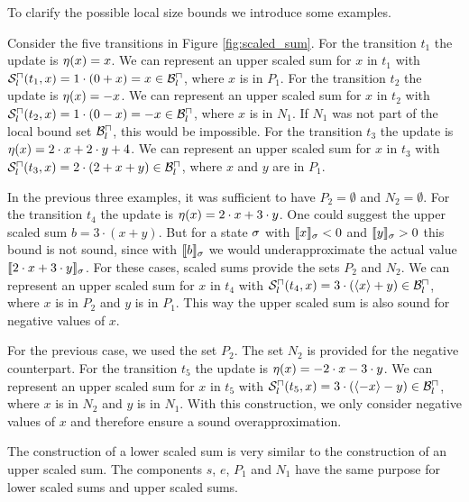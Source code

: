 To clarify the possible local size bounds we introduce some examples.

\begin{example}
  
  Consider the five transitions in Figure \ref{fig:scaled_sum}.
  For the transition $t_1$ the update is $\eta(x) = x$.
  We can represent an upper scaled sum for $x$ in $t_1$ with ${\mathcal{S}^\sqcap_l}(t_1,x) = 1 \cdot (0 + x) = x \in \mathcal{B}^\sqcap_l$, where $x$ is in $P_1$.
  For the transition $t_2$ the update is $\eta(x) = -x$.
  We can represent an upper scaled sum for $x$ in $t_2$ with ${\mathcal{S}^\sqcap_l}(t_2,x) = 1 \cdot (0 - x) = -x \in \mathcal{B}^\sqcap_l$, where $x$ is in $N_1$.
  If $N_1$ was not part of the local bound set $\mathcal{B}^\sqcap_l$, this would be impossible.
  For the transition $t_3$ the update is $\eta(x) = 2 \cdot x + 2 \cdot y + 4$.
  We can represent an upper scaled sum for $x$ in $t_3$ with ${\mathcal{S}^\sqcap_l}(t_3,x) = 2 \cdot (2 + x + y) \in \mathcal{B}^\sqcap_l$, where $x$ and $y$ are in $P_1$.
  
  In the previous three examples, it was sufficient to have $P_2 = \emptyset$ and $N_2 = \emptyset$.
  For the transition $t_4$ the update is $\eta(x) = 2 \cdot x + 3 \cdot y$.
  One could suggest the upper scaled sum $b = 3 \cdot (x + y)$.
  But for a state $\sigma$ with $\llbracket x \rrbracket_{\sigma} < 0$ and $\llbracket y \rrbracket_{\sigma} > 0$ this bound is not sound, since with $\llbracket b \rrbracket_{\sigma}$ we would underapproximate the actual value $\llbracket 2 \cdot x + 3 \cdot y \rrbracket_{\sigma}$.
  For these cases, scaled sums provide the sets $P_2$ and $N_2$.
  We can represent an upper scaled sum for $x$ in $t_4$ with ${\mathcal{S}^\sqcap_l}(t_4,x) = 3 \cdot (\langle x\rangle + y) \in \mathcal{B}^\sqcap_l$, where $x$ is in $P_2$ and $y$ is in $P_1$.
  This way the upper scaled sum is also sound for negative values of $x$.
  
  For the previous case, we used the set $P_2$.
  The set $N_2$ is provided for the negative counterpart.
  For the transition $t_5$ the update is $\eta(x) = -2 \cdot x - 3 \cdot y$.
  We can represent an upper scaled sum for $x$ in $t_5$ with ${\mathcal{S}^\sqcap_l}(t_5,x) = 3 \cdot (\langle-x\rangle - y) \in \mathcal{B}^\sqcap_l$, where $x$ is in $N_2$ and $y$ is in $N_1$.
  With this construction, we only consider negative values of $x$ and therefore ensure a sound overapproximation.

\end{example}
  
The construction of a lower scaled sum is very similar to the construction of an upper scaled sum.
The components $s$, $e$, $P_1$ and $N_1$ have the same purpose for lower scaled sums and upper scaled sums.


